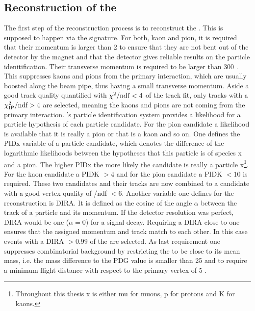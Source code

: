 \subsection{Reconstruction of the \Dz}
The first step of the reconstruction process is to reconstruct the \Dz.
This is supposed to happen via the \DToKpi signature.
For both, kaon and pion, it is required that their momentum is larger than 2 \gev to ensure that they are not bent out of the detector by the magnet and that the \rich detector gives reliable results on the particle idenitification.
Their transverse momentum is required to be larger than 300 \mev.
This suppresses kaons and pions from the primary interaction, which are usually boosted along the beam pipe, thus having a small transverse momentum.
Aside a good track quality quantified with $\chi^2/\mathrm{ndf} < 4$ of the track fit, only tracks with a $\chi^2_{\rm IP}/\text{ndf} > 4$ are selected, meaning the kaons and pions are not coming from the primary interaction.
\lhcb's particle identification system provides a likelihood for a particle hypothesis of each particle candidate.
For the pion candidate a likelihood is available that it is really a pion or that is a kaon and so on.
One defines the PIDx variable of a particle candidate, which denotes the difference of the logarithmic likelihoods between the hypotheses that this particle is of species x and a pion.
The higher PIDx the more likely the candidate is really a particle x\footnote{Throughout this thesis x is either mu for muons, p for protons and K for kaons.}.
For the kaon candidate a PIDK $>4$ and for the pion candidate a PIDK $<10$ is required.
These two candidates and their tracks are now combined to a \Dz candidate with a good vertex quality of \chisqvtx/ndf $<6$.
Another variable one defines for the reconstruction is DIRA.
It is defined as the cosine of the angle $\alpha$ between the track of a particle and its momentum.
If the detector resolution was perfect, DIRA would be one ($\alpha = 0$) for a signal decay.
Requiring a DIRA close to one ensures that the assigned momentum and track match to each other.
In this case events with a DIRA $>0.99$ of the \Dz are selected.
As last requirement one suppresses combinatorial background by restricting the \Dz to be close to its mean mass, i.e. the mass difference to the PDG value is smaller than 25 \mev and to require a minimum \Dz flight distance with respect to the primary vertex of 5 \mm.

